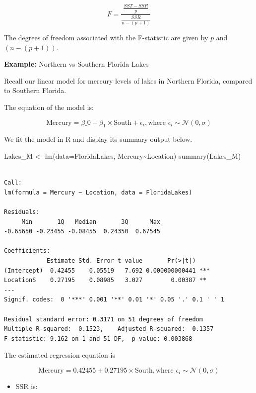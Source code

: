 \documentclass[
  letterpaper,
  DIV=11,
  numbers=noendperiod]{scrreprt}
\newenvironment{Shaded}{\begin{snugshade}}{\end{snugshade}}
\newcommand{\AttributeTok}[1]{\textcolor[rgb]{0.40,0.45,0.13}{#1}}
\newcommand{\FunctionTok}[1]{\textcolor[rgb]{0.28,0.35,0.67}{#1}}
\newcommand{\NormalTok}[1]{\textcolor[rgb]{0.00,0.23,0.31}{#1}}
\newcommand{\OtherTok}[1]{\textcolor[rgb]{0.00,0.23,0.31}{#1}}
\newcommand{\SpecialCharTok}[1]{\textcolor[rgb]{0.37,0.37,0.37}{#1}}
\providecommand{\tightlist}{%
  \setlength{\itemsep}{0pt}\setlength{\parskip}{0pt}}\usepackage{longtable,booktabs,array}
\begin{document}
\[ F=\frac{\frac{SST - SSR}{p}}{\frac{SSR}{n-(p+1)}} \]

The degrees of freedom associated with the F-statistic are given by
\(p\) and \((n-(p+1))\).

\textbf{Example:} Northern vs Southern Florida Lakes

Recall our linear model for mercury levels of lakes in Northern Florida,
compared to Southern Florida.

The equation of the model is:

\[\text{Mercury} = \beta\_0+\beta_1\times\text{South} + \epsilon_i, \text{where } \epsilon_i\sim\mathcal{N}(0, \sigma)\]

We fit the model in R and display its summary output below.

\begin{Shaded}
\begin{Highlighting}[]
\NormalTok{Lakes\_M }\OtherTok{\textless{}{-}} \FunctionTok{lm}\NormalTok{(}\AttributeTok{data=}\NormalTok{FloridaLakes, Mercury}\SpecialCharTok{\textasciitilde{}}\NormalTok{Location)}
\FunctionTok{summary}\NormalTok{(Lakes\_M)}
\end{Highlighting}
\end{Shaded}

\begin{verbatim}

Call:
lm(formula = Mercury ~ Location, data = FloridaLakes)

Residuals:
     Min       1Q   Median       3Q      Max 
-0.65650 -0.23455 -0.08455  0.24350  0.67545 

Coefficients:
            Estimate Std. Error t value       Pr(>|t|)    
(Intercept)  0.42455    0.05519   7.692 0.000000000441 ***
LocationS    0.27195    0.08985   3.027        0.00387 ** 
---
Signif. codes:  0 '***' 0.001 '**' 0.01 '*' 0.05 '.' 0.1 ' ' 1

Residual standard error: 0.3171 on 51 degrees of freedom
Multiple R-squared:  0.1523,    Adjusted R-squared:  0.1357 
F-statistic: 9.162 on 1 and 51 DF,  p-value: 0.003868
\end{verbatim}

The estimated regression equation is

\[ \text{Mercury} = 0.42455+0.27195\times\text{South}, \text{where } \epsilon_i\sim\mathcal{N}(0, \sigma) \]

\begin{itemize}
\tightlist
\item
  SSR is:
\end{itemize}
\end{document}
